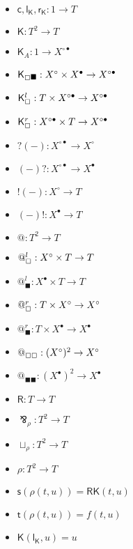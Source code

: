 \documentclass{llncs}
\renewcommand{\:}{\colon}
\begin{document}
\begin{itemize}
  \item $\mathsf{c}, \mathsf{l}_{\mathsf{K}}, \mathsf{r}_{\mathsf{K}} : 1 \rightarrow T$
  \item $\mathsf{K} : T^{2} \rightarrow T$
  \item $\mathsf{K}_{A} : 1 \rightarrow X^{\circ\bullet}$
  \item $\mathsf{K}_{\boxempty\blacksquare} : X^{\circ} \times X^{\bullet} \rightarrow X^{\circ\bullet}$
  \item $\mathsf{K}_{\boxempty}^{l} : T \times X^{\circ\bullet} \rightarrow X^{\circ\bullet}$
  \item $\mathsf{K}_{\boxempty}^{r} :  X^{\circ\bullet} \times T \rightarrow X^{\circ\bullet}$
  \item $?(-) : X^{\circ\bullet}  \rightarrow X^{\circ}$
  \item $(-)? : X^{\circ\bullet}  \rightarrow X^{\bullet}$
  \item $!(-) : X^{\circ}  \rightarrow T$
  \item $(-)! : X^{\bullet}  \rightarrow T$
  \item $@ : T^{2} \rightarrow T$
  \item $@_{\boxempty}^{l} : X^{\circ} \times T \rightarrow T$
  \item $@_{\blacksquare}^{l} : X^{\bullet} \times T \rightarrow T$
  \item $@_{\boxempty}^{r} : T \times X^{\circ} \rightarrow X^{\circ}$
  \item $@_{\blacksquare}^{r} : T \times X^{\bullet} \rightarrow X^{\bullet}$
  \item $@_{\boxempty\boxempty} : (X^{\circ})^{2} \rightarrow X^{\circ}$
  \item $@_{\blacksquare\blacksquare} : (X^{\bullet})^{2} \rightarrow X^{\bullet}$
  \item $\mathsf{R} : T \rightarrow T$
  \item $\bindnasrepma_{\rho} : T^{2} \rightarrow T$
  \item $\sqcup_{\rho} : T^{2} \rightarrow T$
  \item $\rho : T^{2} \rightarrow T$             %
  \item $\mathsf{s}(\rho(t,u)) = \mathsf{R}\mathsf{K}(t, u) $
  \item $\mathsf{t}(\rho(t,u)) = f(t,u)$                      %
  \item $\mathsf{K}(\mathsf{l}_{\mathsf{K}}, u) = u$

\end{itemize}
\end{document}
